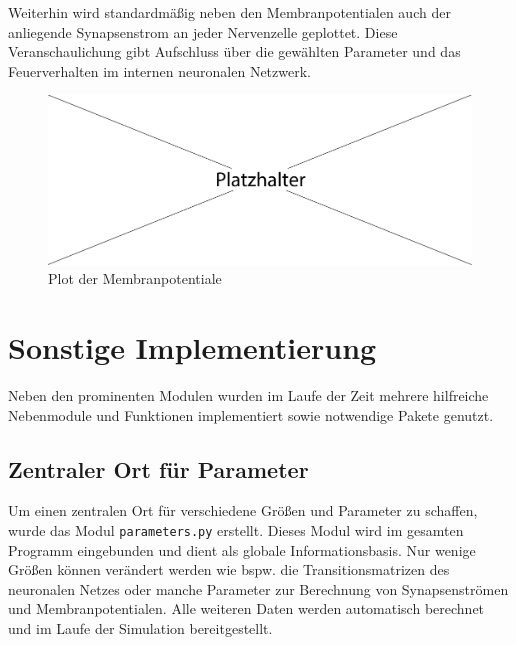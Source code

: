 	Weiterhin wird standardmäßig neben den Membranpotentialen auch der anliegende Synapsenstrom an jeder Nervenzelle geplottet. Diese Veranschaulichung gibt Aufschluss über die gewählten Parameter und das Feuerverhalten im internen neuronalen Netzwerk.\\
	\begin{figure}[!h] %
		\centering
		\includegraphics[width=12cm]{figures/sonstiges/platzhalter.pdf}
		\caption{Plot der Membranpotentiale}
		\label{fig:imp_plot_1}
	\end{figure}

\section{Sonstige Implementierung}
\label{sec:imp_vis}
	Neben den prominenten Modulen wurden im Laufe der Zeit mehrere hilfreiche Nebenmodule und Funktionen implementiert sowie notwendige Pakete genutzt.
	\subsection{Zentraler Ort für Parameter}
		Um einen zentralen Ort für verschiedene Größen und Parameter zu schaffen, wurde das Modul \texttt{parameters.py} erstellt. Dieses Modul wird im gesamten Programm eingebunden und dient als globale Informationsbasis. Nur wenige Größen können verändert werden wie bspw. die Transitionsmatrizen des neuronalen Netzes oder manche Parameter zur Berechnung von Synapsenströmen und Membranpotentialen. Alle weiteren Daten werden automatisch berechnet und im Laufe der Simulation bereitgestellt.
